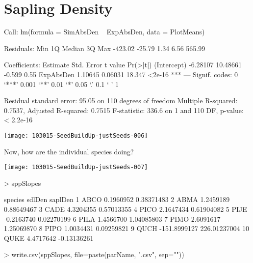 \documentclass{article}
\begin{document}
\newpage

\section{Sapling Density}
\begin{Schunk}
\begin{Soutput}
Call:
lm(formula = SimAbsDen ~ ExpAbsDen, data = PlotMeans)

Residuals:
    Min      1Q  Median      3Q     Max 
-423.02  -25.79    1.34    6.56  565.99 

Coefficients:
            Estimate Std. Error t value Pr(>|t|)    
(Intercept) -6.28107   10.48661  -0.599     0.55    
ExpAbsDen    1.10645    0.06031  18.347   <2e-16 ***
---
Signif. codes:  0 ‘***’ 0.001 ‘**’ 0.01 ‘*’ 0.05 ‘.’ 0.1 ‘ ’ 1

Residual standard error: 95.05 on 110 degrees of freedom
Multiple R-squared:  0.7537,	Adjusted R-squared:  0.7515 
F-statistic: 336.6 on 1 and 110 DF,  p-value: < 2.2e-16
\end{Soutput}
\end{Schunk}
\texttt{[image: 103015-SeedBuildUp-justSeeds-006]}

Now, how are the individual species doing?

\texttt{[image: 103015-SeedBuildUp-justSeeds-007]}
\begin{Schunk}
\begin{Sinput}
>   sppSlopes
\end{Sinput}
\begin{Soutput}
   species       sdlDen      saplDen
1     ABCO    0.1960952   0.38371483
2     ABMA    1.2459189   0.88649467
3     CADE    4.3204355   0.57013355
4     PICO    2.1647434   0.61904082
5     PIJE   -0.2163740   0.02270199
6     PILA    1.4566700   1.04085803
7     PIMO    2.6091617   1.25069870
8     PIPO    1.0034431   0.09259821
9     QUCH -151.8999127 226.01237004
10    QUKE    4.4717642  -0.13136261
\end{Soutput}
\begin{Sinput}
>     write.csv(sppSlopes, file=paste(parName, ".csv", sep=""))
\end{Sinput}
\end{Schunk}


\newpage
\end{document}
